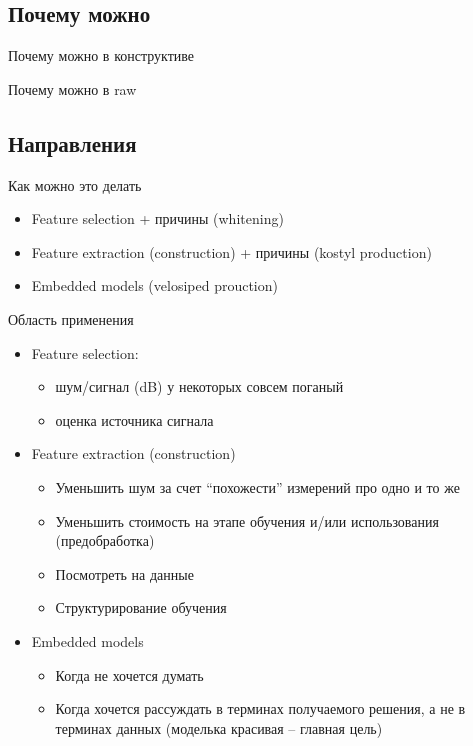 \documentclass[14pt, fleqn, xcolor={dvipsnames, table}]{beamer}
\begin{document}
\subsection{Почему можно} %
\begin{frame}{Почему можно в конструктиве}
\end{frame}

\begin{frame}{Почему можно в raw}
\end{frame}

\subsection{Направления}
\begin{frame}{Как можно это делать}
\begin{itemize}
  \item Feature selection + причины (whitening)
  \item Feature extraction (construction) + причины (kostyl production)
  \item Embedded models (velosiped prouction)
\end{itemize}
\end{frame}

\begin{frame}{Область применения}
\begin{itemize}
  \item Feature selection: 
  \begin{itemize}
    \item шум/сигнал (dB) у некоторых совсем поганый
    \item оценка источника сигнала
  \end{itemize}
  \item Feature extraction (construction)
  \begin{itemize}
    \item Уменьшить шум за счет ``похожести'' измерений про одно и то же
    \item Уменьшить стоимость на этапе обучения и/или использования (предобработка)
    \item Посмотреть на данные
    \item Структурирование обучения
  \end{itemize}
  \item Embedded models
  \begin{itemize}
    \item Когда не хочется думать

    \item Когда хочется рассуждать в терминах получаемого решения, а не в терминах данных (моделька красивая -- главная цель)
  \end{itemize}
\end{itemize}
\end{frame}
\end{document}
